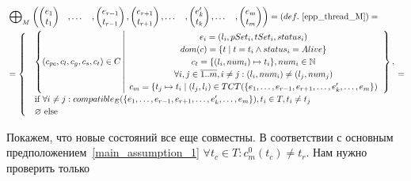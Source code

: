 \begin{align}
& \mathrel{\bigoplus}_M
\begin{pmatrix}
\begin{pmatrix}
e_1 \\
t_1 
\end{pmatrix}&,
\dots&,
\begin{pmatrix}
e_{r-1} \\
t_{r-1} 
\end{pmatrix},
\begin{pmatrix}
e_{r+1} \\
t_{r+1} 
\end{pmatrix},
\dots& ,
\begin{pmatrix}
e_k' \\
t_k 
\end{pmatrix} ,
\dots& ,
\begin{pmatrix}
e_m \\
t_m 
\end{pmatrix}
\end{pmatrix} = (def.~\ref{epp_thread_M}) = \nonumber \\
& = \begin{cases}
& \left\lbrace (c_{pc},c_l,c_g,c_s, c_t) \in C 
\left| 
\begin{array}{c}
e_i = (l_i, pSet_i, tSet_i, status_i) \\
dom(c) = \{t \mid t = t_i \land status_i = Alive\}\\
c_t = \{(l_i, num_i) \mapsto t_i\}, num_i \in \mathbb{N} \\
\forall i, j \in \overline{1..m}, i \neq j: (l_i, num_i) \neq (l_j, num_j)\\
c_m = \{ t_j \mapsto t_i \mid (l_j, l_i) \in TCT(\{e_1, \dots, e_{r-1}, e_{r+1}, \dots, e_k', \dots, e_m\}) \\
\end{array}
\right.
\right\rbrace, \\
& \mbox{if } \forall i \neq j: compatible_{E}(\{e_1, \dots, e_{r-1}, e_{r+1}, \dots, e_k', \dots, e_m\}), t_i \in T, t_i \neq t_j \\
& \varnothing \mbox{ else}
\end{cases} = \nonumber
\end{align}

Покажем, что новые состояний все еще совместны.
В соответствии с основным предположением~\ref{main_assumption_1} $\forall t_c \in T: c^0_m(t_c) \neq t_r$.
Нам нужно проверить только

